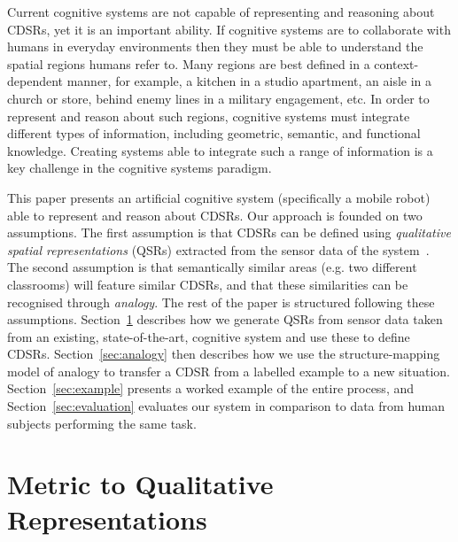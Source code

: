 \documentclass[letterpaper]{article}
\begin{document}
Current cognitive systems are not capable of representing and reasoning about CDSRs, yet it is an important ability. If cognitive systems are to collaborate with humans in everyday environments then they must be able to understand the spatial regions humans refer to. Many regions are best defined in a context-dependent manner, for example, a kitchen in a studio apartment, an aisle in a church or store, behind enemy lines in a military engagement, etc. In order to represent and reason about such regions, cognitive systems must integrate different types of information, including geometric, semantic, and functional knowledge. Creating systems able to integrate such a range of information is a key challenge in the cognitive systems paradigm.

This paper presents an artificial cognitive system (specifically a mobile robot) able to represent and reason about CDSRs. Our approach is founded on two assumptions. The first assumption is that CDSRs can be defined using \emph{qualitative spatial representations} (QSRs) extracted from the sensor data of the system~\cite{Cohn:2001}. The second assumption is that semantically similar areas (e.g. two different classrooms) will feature similar CDSRs, and that these similarities can be recognised through \emph{analogy}. The rest of the paper is structured following these assumptions. Section~\ref{sec:qsr-gen} describes how we generate QSRs from sensor data taken from an existing, state-of-the-art, cognitive system and use these to define CDSRs. Section~\ref{sec:analogy} then describes how we use the structure-mapping model of analogy \cite{Gentner1983a} to transfer a CDSR from a labelled example to a new situation. Section~\ref{sec:example} presents a worked example of the entire process, and Section~\ref{sec:evaluation} evaluates our system in comparison to data from human subjects performing the same task.


\section{Metric to Qualitative Representations}\label{sec:qsr-gen}

\end{document}
